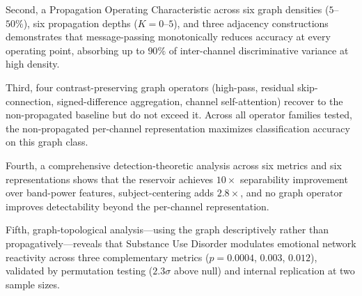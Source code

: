 Second, a Propagation Operating Characteristic across six graph densities ($5$--$50\%$), six propagation depths ($K = 0$--$5$), and three adjacency constructions demonstrates that message-passing monotonically reduces accuracy at every operating point, absorbing up to $90\%$ of inter-channel discriminative variance at high density.

Third, four contrast-preserving graph operators (high-pass, residual skip-connection, signed-difference aggregation, channel self-attention) recover to the non-propagated baseline but do not exceed it. Across all operator families tested, the non-propagated per-channel representation maximizes classification accuracy on this graph class.

Fourth, a comprehensive detection-theoretic analysis across six metrics and six representations shows that the reservoir achieves $10\times$ separability improvement over band-power features, subject-centering adds $2.8\times$, and no graph operator improves detectability beyond the per-channel representation.

Fifth, graph-topological analysis---using the graph descriptively rather than propagatively---reveals that Substance Use Disorder modulates emotional network reactivity across three complementary metrics ($p = 0.0004$, $0.003$, $0.012$), validated by permutation testing ($2.3\sigma$ above null) and internal replication at two sample sizes.
